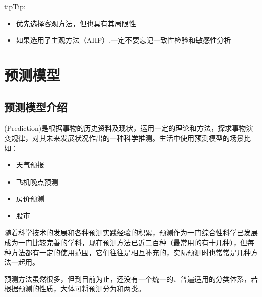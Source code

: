 \documentclass[letterpaper,10pt,english]{sphinxmanual}
\let\sphinxpxdimen\pdfpxdimen\else\newdimen\sphinxpxdimen
\begin{document}
\begin{sphinxadmonition}{tip}{Tip:}\begin{itemize}
\item {} 
优先选择客观方法，但也具有其局限性

\item {} 
如果选用了主观方法（AHP）,一定不要忘记一致性检验和敏感性分析

\end{itemize}
\end{sphinxadmonition}


\chapter{预测模型}
\label{\detokenize{docs/prediction_model:id1}}\label{\detokenize{docs/prediction_model::doc}}

\section{预测模型介绍}
\label{\detokenize{docs/prediction_model:id2}}
(Prediction)是根据事物的历史资料及现状，运用一定的理论和方法，探求事物演变规律，对其未来发展状况作出的一种科学推测。生活中使用预测模型的场景比如：
\begin{itemize}
\item {} 
天气预报

\item {} 
飞机晚点预测

\item {} 
房价预测

\item {} 
股市

\end{itemize}

随着科学技术的发展和各种预测实践经验的积累，预测作为一门综合性科学已发展成为一门比较完善的学科，现在预测方法已近二百种（最常用的有十几种），但每种方法都有一定的使用范围，它们往往是相互补充的，实际预测时也常常是几种方法一起用。

预测方法虽然很多，但到目前为止，还没有一个统一的、普遍适用的分类体系，若根据预测的性质，大体可将预测分为和两类。

\begin{figure}[htbp]
\centering

\noindent\sphinxincludegraphics[height=450\sphinxpxdimen]{{01}.png}
\end{figure}
\end{document}
